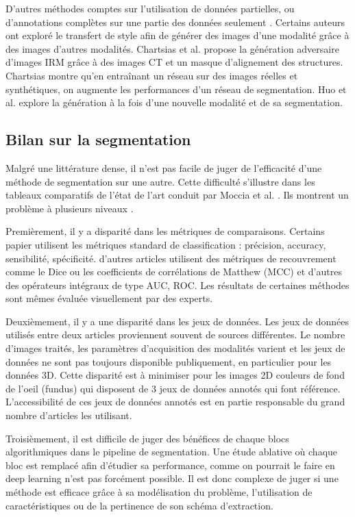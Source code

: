 D'autres méthodes comptes sur l'utilisation de données partielles, ou d'annotations complètes sur une partie des données seulement \cite{Tajbakhsh2020_imperfect_datasets}. Certains auteurs ont exploré le transfert de style afin de générer des images d'une modalité grâce à des images d'autres modalités. Chartsias et al. \cite{Chartsias2017_heart_adversarial_im} propose la génération adversaire d'images IRM grâce à des images CT et un masque d'alignement des structures. Chartsias montre qu'en entraînant un réseau sur des images réelles et synthétiques, on augmente les performances d'un réseau de segmentation. Huo et al. \cite{Huo2018_adversarial} explore la génération à la fois d'une nouvelle modalité et de sa segmentation.

\subsection{Bilan sur la segmentation}

Malgré une littérature dense, il n'est pas facile de juger de l'efficacité d'une méthode de segmentation sur une autre. Cette difficulté s'illustre dans les tableaux comparatifs de l'état de l'art conduit par  Moccia et al. \cite{Moccia2018_survey}. Ils montrent un problème à plusieurs niveaux .

Premièrement, il y a disparité dans les métriques de comparaisons. Certains papier utilisent les métriques standard de classification : précision, accuracy, sensibilité, spécificité. d'autres articles utilisent des métriques de recouvrement comme le Dice ou les coefficients de corrélations de Matthew (MCC) et d'autres des opérateurs intégraux de type AUC, ROC. Les résultats de certaines méthodes sont mêmes évaluée visuellement par des experts.

Deuxièmement, il y a une disparité dans les jeux de données. Les jeux de données utilisés entre deux articles proviennent souvent de sources différentes. Le nombre d'images traités, les paramètres d'acquisition des modalités varient et les jeux de données ne sont pas toujours disponible publiquement, en particulier pour les données 3D. Cette disparité est à minimiser pour les images 2D couleurs de fond de l'oeil (fundus) qui disposent de 3 jeux de données annotés qui font référence. L'accessibilité de ces jeux de données annotés est en partie responsable du grand nombre d'articles les utilisant.

Troisièmement, il est difficile de juger des bénéfices de chaque blocs algorithmiques dans le pipeline de segmentation. Une étude ablative où chaque bloc est remplacé afin d'étudier sa performance, comme on pourrait le faire en deep learning n'est pas forcément possible. Il est donc complexe de juger si une méthode est efficace grâce à sa modélisation du problème, l'utilisation de caractéristiques ou de la pertinence de son schéma d'extraction.

